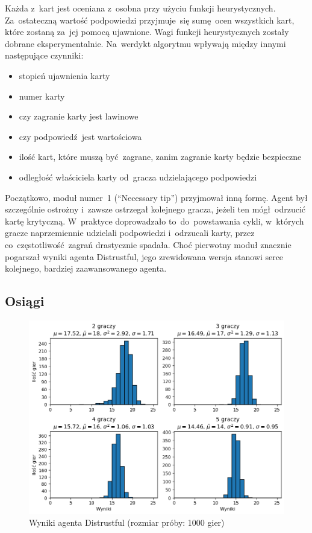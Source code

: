 \documentclass[declaration,shortabstract,inz]{iithesis}
\begin{document}
Każda z~kart jest oceniana z~osobna przy użyciu funkcji heurystycznych. Za~ostateczną wartość podpowiedzi przyjmuje~się sumę ocen wszystkich kart, które zostaną za~jej pomocą ujawnione. Wagi funkcji heurystycznych zostały dobrane eksperymentalnie. Na~werdykt algorytmu wpływają między innymi następujące czynniki:
\begin{itemize}
	\item stopień ujawnienia karty
	\item numer karty
	\item czy zagranie karty jest lawinowe
	\item czy podpowiedź jest wartościowa
	\item ilość kart, które muszą być zagrane, zanim zagranie karty będzie bezpieczne
	\item odległość właściciela karty od~gracza udzielającego podpowiedzi
\end{itemize}

Początkowo, moduł numer~1 (``Necessary tip'') przyjmował inną formę. Agent był szczególnie ostrożny i~zawsze ostrzegał kolejnego gracza, jeżeli ten mógł odrzucić kartę krytyczną. W~praktyce doprowadzało to~do~powstawania cykli, w~których gracze naprzemiennie udzielali podpowiedzi i~odrzucali karty, przez co~częstotliwość zagrań drastycznie spadała. Choć pierwotny moduł znacznie pogarszał wyniki agenta Distrustful, jego zrewidowana wersja stanowi serce kolejnego, bardziej zaawansowanego agenta.

\subsection*{Osiągi}

\begin{figure}[H]
	\centering
	\captionsetup{format=hang}
	\includegraphics[width=\textwidth,height=\textheight,keepaspectratio]{Distrustful.png}
	\caption[Caption]{Wyniki agenta Distrustful (rozmiar próby: 1000 gier)}
	\label{fig:Distrustful}
\end{figure}
\end{document}
